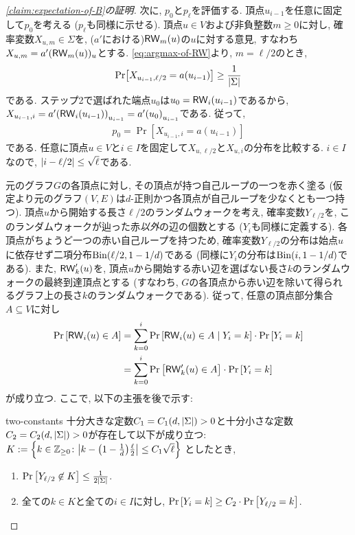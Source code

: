 \begin{proof}[\cref{claim:expectation-of-B}の証明]
  次に, $p_0$と$p_\ell$を評価する.
  頂点$u_{i-1}$を任意に固定して$p_0$を考える ($p_\ell$も同様に示せる).
  頂点$u\in V$および非負整数$m\ge 0$に対し, 確率変数$X_{u,m}\in\Sigma$を, ($a'$における)$\mathsf{RW}_m(u)$の$u$に対する意見, すなわち$X_{u,m} = a'(\mathsf{RW}_m(u))_u$とする.
  \cref{eq:argmax-of-RW}より, $m=\ell/2$のとき, 
  \begin{align}
  \Pr[X_{u_{i-1},\ell/2} = a(u_{i-1})] \ge \frac{1}{\abs{\Sigma}} \label{eq:center_opinion}
  \end{align}
  である.
  ステップ2で選ばれた端点$u_0$は$u_0=\mathsf{RW}_i(u_{i-1})$であるから, $X_{u_{i-1},i}=a'\qty( \mathsf{RW}_i(u_{i-1}) )_{u_{i-1}} = a'\qty(u_0)_{u_{i-1}}$である.
  従って, 
  \begin{align}
    p_0 = \Pr[X_{u_{i-1},i} = a(u_{i-1})] \label{eq:p_0}
  \end{align}
  である. 任意に頂点$u\in V$と$i\in I$を固定して$X_{u,\ell/2}$と$X_{u,i}$の分布を比較する.
  $i\in I$なので, $\abs{i-\ell/2} \le \sqrt{\ell}$である.

  元のグラフ$G$の各頂点に対し, その頂点が持つ自己ループの一つを赤く塗る
  (仮定より元のグラフ$(V,E)$は$d$-正則かつ各頂点が自己ループを少なくとも一つ持つ).
  頂点$u$から開始する長さ$\ell/2$のランダムウォークを考え,
  確率変数$Y_{\ell/2}$を, このランダムウォークが辿った赤\emph{以外}の辺の個数とする ($Y_i$も同様に定義する).
  各頂点がちょうど一つの赤い自己ループを持つため,
  確率変数$Y_{\ell/2}$の分布は始点$u$に依存せず二項分布$\mathrm{Bin}(\ell/2,1-1/d)$である (同様に$Y_i$の分布は$\mathrm{Bin}(i,1-1/d)$である).
  また, $\mathsf{RW}'_k(u)$を, 頂点$u$から開始する赤い辺を選ばない長さ$k$のランダムウォークの最終到達頂点とする (すなわち, $G$の各頂点から赤い辺を除いて得られるグラフ上の長さ$k$のランダムウォークである).
  従って, 任意の頂点部分集合$A\subseteq V$に対し
  \begin{align}
    \Pr\qty[\mathsf{RW}_{i}(u)\in A] &= \sum_{k=0}^{i} \Pr\qty[\mathsf{RW}_{i}(u) \in A \;\middle\vert\; Y_{i}=k] \cdot \Pr\qty[Y_{i}=k] \nonumber \\
    &= \sum_{k=0}^{i} \Pr\qty[\mathsf{RW}'_k(u) \in A] \cdot \Pr\qty[Y_{i}=k] \label{eq:RW_i_distribution}
  \end{align}
  が成り立つ.
  ここで, 以下の主張を後で示す:
  \begin{claim}{}{two-constants}
  十分大きな定数$C_1=C_1(d,\abs{\Sigma})>0$と十分小さな定数$C_2=C_2(d,\abs{\Sigma})>0$が存在して以下が成り立つ:
  $K:= \qty{ k\in \mathbb{Z}_{\ge 0} \colon \abs{k - \qty(1-\frac{1}{d})\frac{\ell}{2}} \le C_1\sqrt{\ell} }$ としたとき,
  \begin{enumerate}
    \item $\Pr\qty[Y_{\ell/2} \not\in K] \le \frac{1}{2\abs{\Sigma}}$.
    \item 全ての$k\in K$と全ての$i\in I$に対し, $\Pr\qty[Y_i=k] \ge C_2\cdot \Pr\qty[Y_{\ell/2}=k]$.
  \end{enumerate}
  \end{claim}
  

\end{proof}
